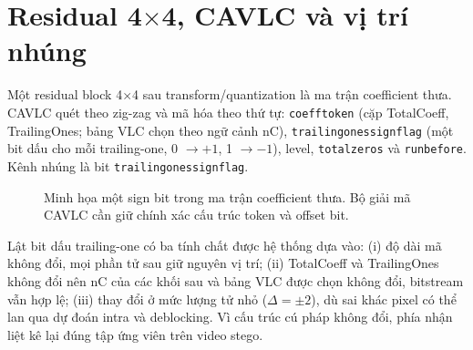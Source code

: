 \documentclass[11pt,a4paper]{article}
\renewcommand{\_}{\origunderscore\allowbreak}
\begin{document}
\section{\texorpdfstring{Residual 4$\times$4, CAVLC và vị trí nhúng}{Residual 4x4, CAVLC và vị trí nhúng}}
Một residual block 4$\times$4 sau transform/quantization là ma trận coefficient thưa. CAVLC quét theo zig-zag và mã hóa theo thứ tự: \texttt{coeff\_token} (cặp TotalCoeff, TrailingOnes; bảng VLC chọn theo ngữ cảnh nC), \texttt{trailing\_ones\_sign\_flag} (một bit dấu cho mỗi trailing-one, 0 $\rightarrow +1$, 1 $\rightarrow -1$), level, \texttt{total\_zeros} và \texttt{run\_before}. Kênh nhúng là bit \texttt{trailing\_ones\_sign\_flag}.

\begin{figure}[H]\centering
{}
\caption{Minh họa một sign bit trong ma trận coefficient thưa. Bộ giải mã CAVLC cần giữ chính xác cấu trúc token và offset bit.}
\label{fig:sign-bit}
\end{figure}

Lật bit dấu trailing-one có ba tính chất được hệ thống dựa vào: (i) độ dài mã không đổi, mọi phần tử sau giữ nguyên vị trí; (ii) TotalCoeff và TrailingOnes không đổi nên nC của các khối sau và bảng VLC được chọn không đổi, bitstream vẫn hợp lệ; (iii) thay đổi ở mức lượng tử nhỏ ($\Delta=\pm2$), dù sai khác pixel có thể lan qua dự đoán intra và deblocking. Vì cấu trúc cú pháp không đổi, phía nhận liệt kê lại đúng tập ứng viên trên video stego.
\end{document}

